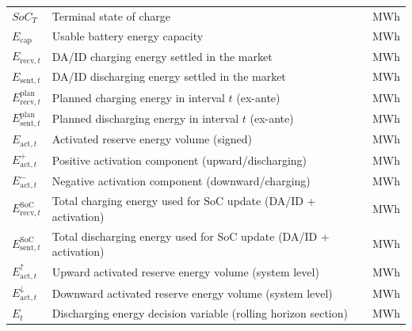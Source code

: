 \begin{longtable}{@{}>{\raggedright\arraybackslash}p{} >{\raggedright\arraybackslash}p{} >{\raggedright\arraybackslash}p{}@{}}
    $SoC_T$                                   & Terminal state of charge                                                             & MWh           \\
    $E_{\text{cap}}$                          & Usable battery energy capacity                                                       & MWh           \\
    $E_{\text{recv},t}$                       & DA/ID charging energy settled in the market                                          & MWh           \\
    $E_{\text{sent},t}$                       & DA/ID discharging energy settled in the market                                       & MWh           \\
    $E_{\text{recv},t}^{\text{plan}}$         & Planned charging energy in interval $t$ (ex-ante)                                    & MWh           \\
    $E_{\text{sent},t}^{\text{plan}}$         & Planned discharging energy in interval $t$ (ex-ante)                                 & MWh           \\
    $E_{\text{act},t}$                        & Activated reserve energy volume (signed)                                             & MWh           \\
    $E_{\text{act},t}^{+}$                    & Positive activation component (upward/discharging)                                   & MWh           \\
    $E_{\text{act},t}^{-}$                    & Negative activation component (downward/charging)                                    & MWh           \\
    $E_{\text{recv},t}^{\text{SoC}}$          & Total charging energy used for SoC update (DA/ID + activation)                       & MWh           \\
    $E_{\text{sent},t}^{\text{SoC}}$          & Total discharging energy used for SoC update (DA/ID + activation)                    & MWh           \\
    $E_{\text{act},t}^{\uparrow}$             & Upward activated reserve energy volume (system level)                                & MWh           \\
    $E_{\text{act},t}^{\downarrow}$           & Downward activated reserve energy volume (system level)                              & MWh           \\
    $E_t$                                     & Discharging energy decision variable (rolling horizon section)                       & MWh           \\

\end{longtable}
